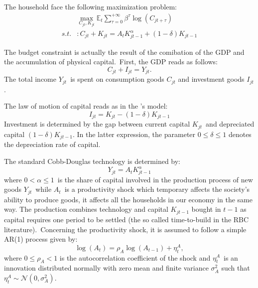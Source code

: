 \documentclass[a4paper,12pt]{article}%
\begin{document}
The household face the following maximization problem:%
\begin{align*}
&  \max_{C_{jt},K_{jt}}\mathbb{E}_{t}\sum_{\tau=0}^{+\infty}\beta^{\tau}%
\log\left(  C_{jt+\tau}\right) \\
s.t.  &  :C_{jt}+K_{jt}=A_{t}K_{jt-1}^{\alpha}+\left(  1-\delta\right)
K_{jt-1}%
\end{align*}


The budget constraint is actually the result of the comibation of the GDP and
the accumulation of physical capital.\ First, the GDP reads as follows:%
\begin{equation}
C_{jt}+I_{jt}=Y_{jt}. \label{eq hh budget constraint}%
\end{equation}
The total income $Y_{jt}$\ is spent on consumption goods $C_{jt}$ and
investment goods $I_{jt}$.

The law of motion of capital reads as in the \cite{solow1956contribution}'s
model:%
\begin{equation}
I_{jt}=K_{jt}-\left(  1-\delta\right)  K_{jt-1}
\label{eq hh capital law of motion}%
\end{equation}
Investment is determined by the gap between current capital $K_{jt}$\ and
depreciated capital $\left(  1-\delta\right)  K_{jt-1}$. In the latter
expression, the parameter $0\leq\delta\leq1$ denotes the depreciation rate of capital.

The standard Cobb-Douglas technology is determined by:%
\begin{equation}
Y_{jt}=A_{t}K_{jt-1}^{\alpha} \label{eq hh production}%
\end{equation}
where $0<\alpha\leq1$\ is the share of capital involved in the production
process of new goods $Y_{jt}$\ while $A_{t}$\ is a productivity shock which
temporary affects the society's ability to produce goods, it affects all the
households in our economy in the same way. The production combines technology
and capital $K_{jt-1}$ bought in $t-1$ as capital requires one period to be
settled (the so called time-to-build in the RBC literature).\ Concerning the
productivity shock, it is assumed to follow a simple AR(1) process given by:%
\begin{equation}
\log\left(  A_{t}\right)  =\rho_{A}\log\left(  A_{t-1}\right)  +\eta_{t}^{A},
\end{equation}
where $0\leq\rho_{A}<1$ is the autocorrelation coefficient of the shock and
$\eta_{t}^{A}$\ is an innovation distributed normally with zero mean and
finite variance $\sigma_{A}^{2}$ such that $\eta_{t}^{A}\sim\mathcal{N}%
(0,\sigma_{A}^{2})$.%
\end{document}

